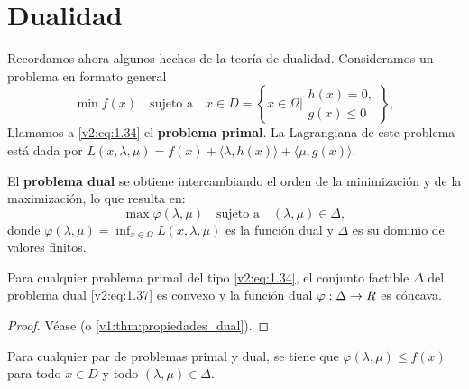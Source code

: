 
\section{Dualidad}

Recordamos ahora algunos hechos de la teoría de dualidad. Consideramos un problema en formato general
\begin{equation}
    \min f(x) \quad \text{sujeto a} \quad x \in D = \left\{ x \in \Omega \mathrel{\bigg|} \begin{array}{l} h(x) = 0, \\ g(x) \le 0 \end{array} \right\},
    \label{v2:eq:1.34}
\end{equation}
Llamamos a \eqref{v2:eq:1.34} el \textbf{problema primal}. La Lagrangiana de este problema está dada por $L(x, \lambda, \mu) = f(x) + \langle \lambda, h(x) \rangle + \langle \mu, g(x) \rangle$.

El \textbf{problema dual} se obtiene intercambiando el orden de la minimización y de la maximización, lo que resulta en:
\begin{equation}
    \max \varphi(\lambda, \mu) \quad \text{sujeto a} \quad (\lambda, \mu) \in \Delta,
    \label{v2:eq:1.37}
\end{equation}
donde $\varphi(\lambda, \mu) = \inf_{x \in \Omega} L(x, \lambda, \mu)$ es la función dual y $\Delta$ es su dominio de valores finitos.

\begin{theorem}\label{v2:thm:1.4.1}
    Para cualquier problema primal del tipo \eqref{v2:eq:1.34}, el conjunto factible $\Delta$ del problema dual \eqref{v2:eq:1.37} es convexo y la función dual $\varphi : \Delta \to R$ es cóncava.
\end{theorem}

\begin{proof}
    Véase \cite{izmailov2020otimizacaovolume1} (o \cref{v1:thm:propiedades_dual}).
\end{proof}

\begin{theorem}\label{v2:thm:1.4.2}
    Para cualquier par de problemas primal y dual, se tiene que $\varphi(\lambda, \mu) \le f(x)$ para todo $x \in D$ y todo $(\lambda, \mu) \in \Delta$.
\end{theorem}

